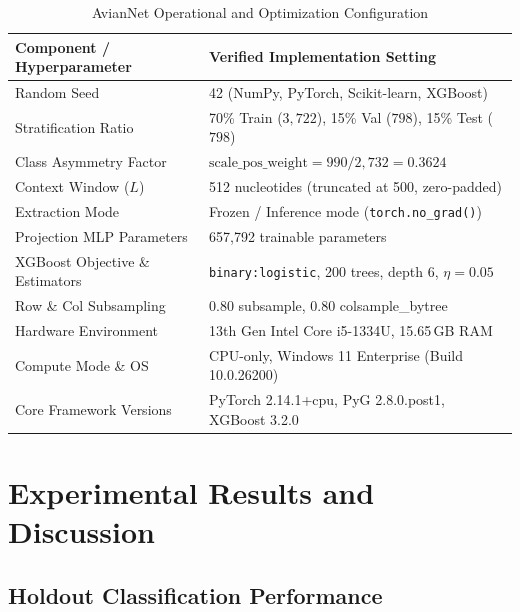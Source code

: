 \documentclass[conference]{IEEEtran}
\begin{document}
\begin{table}[t]
  \centering
  \caption{AvianNet Operational and Optimization Configuration}
  \label{tab:training_configs}
  \begin{tabular}{ll}
    \toprule
    \textbf{Component / Hyperparameter} & \textbf{Verified Implementation Setting} \\
    \midrule
    Random Seed                         & 42 (NumPy, PyTorch, Scikit-learn, XGBoost) \\
    Stratification Ratio                & 70\% Train ($3{,}722$), 15\% Val ($798$), 15\% Test ($798$) \\
    Class Asymmetry Factor              & $\text{scale\_pos\_weight} = 990 / 2{,}732 = 0.3624$ \\
    Context Window ($L$)                & 512 nucleotides (truncated at 500, zero-padded) \\
    Extraction Mode                     & Frozen / Inference mode (\texttt{torch.no\_grad()}) \\
    Projection MLP Parameters           & 657,792 trainable parameters \\
    XGBoost Objective \& Estimators     & \texttt{binary:logistic}, 200 trees, depth 6, $\eta = 0.05$ \\
    Row \& Col Subsampling              & 0.80 subsample, 0.80 colsample\_bytree \\
    Hardware Environment                & 13th Gen Intel Core i5-1334U, 15.65\,GB RAM \\
    Compute Mode \& OS                  & CPU-only, Windows 11 Enterprise (Build 10.0.26200) \\
    Core Framework Versions             & PyTorch 2.14.1+cpu, PyG 2.8.0.post1, XGBoost 3.2.0 \\
    \bottomrule
  \end{tabular}
\end{table}

\section{Experimental Results and Discussion}
\label{sec:results}

\subsection{Holdout Classification Performance}
\label{sec:classification_performance}
\end{document}
